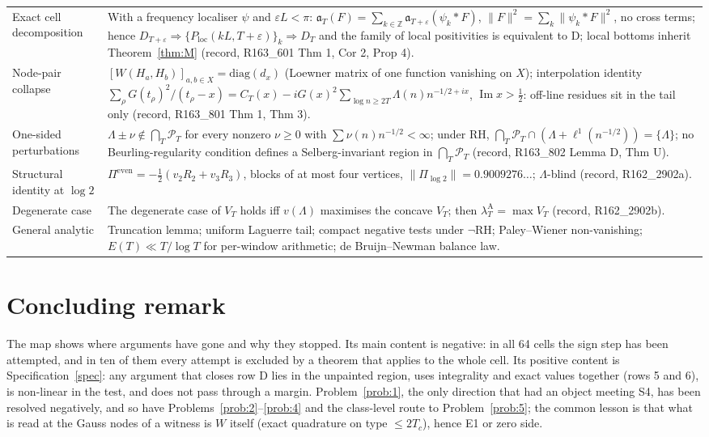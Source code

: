 \documentclass[11pt]{amsart}
\theoremstyle{definition}
\theoremstyle{remark}
\newcommand{\Z}{\mathbb Z}
\newcommand{\Iml}{\operatorname{Im}}
\newcommand{\PT}{\mathcal P_T}
\newcommand{\lamA}{\lambda^{\mathrm A}_T}
\begin{document}
\begin{longtable}{@{}p{4.2cm}p{10.3cm}@{}}
Exact cell decomposition & With a frequency localiser $\psi$ and $\varepsilon L<\pi$: $\mathfrak a_T(F)=\sum_{k\in\Z}\mathfrak a_{T+\varepsilon}(\psi_k*F)$, $\|F\|^2=\sum_k\|\psi_k*F\|^2$, no cross terms; hence $D_{T+\varepsilon}\Rightarrow\{P_{\mathrm{loc}}(kL,T+\varepsilon)\}_k\Rightarrow D_T$ and the family of local positivities is equivalent to D; local bottoms inherit Theorem~\ref{thm:M} (record, R163\_601 Thm 1, Cor 2, Prop 4). \\
Node-pair collapse & $[W(H_a,H_b)]_{a,b\in X}=\mathrm{diag}(d_x)$ (Loewner matrix of one function vanishing on $X$); interpolation identity $\sum_\rho G(t_\rho)^2/(t_\rho-x)=C_T(x)-iG(x)^2\sum_{\log n\ge2T}\Lambda(n)n^{-1/2+ix}$, $\Iml x>\frac12$: off-line residues sit in the tail only (record, R163\_801 Thm 1, Thm 3). \\
One-sided perturbations & $\Lambda\pm\nu\notin\bigcap_T\PT$ for every nonzero $\nu\ge0$ with $\sum\nu(n)n^{-1/2}<\infty$; under RH, $\bigcap_T\PT\cap(\Lambda+\ell^1(n^{-1/2}))=\{\Lambda\}$; no Beurling-regularity condition defines a Selberg-invariant region in $\bigcap_T\PT$ (record, R163\_802 Lemma D, Thm U). \\
Structural identity at $\log2$ & $\Pi^{\mathrm{even}}=-\frac12(v_2R_2+v_3R_3)$, blocks of at most four vertices, $\|\Pi_{\log2}\|=0.9009276\ldots$; $\Lambda$-blind (record, R162\_2902a). \\
Degenerate case & The degenerate case of $V_T$ holds iff $v(\Lambda)$ maximises the concave $V_T$; then $\lamA=\max V_T$ (record, R162\_2902b). \\
General analytic & Truncation lemma; uniform Laguerre tail; compact negative tests under $\neg$RH; Paley--Wiener non-vanishing; $E(T)\ll T/\log T$ for per-window arithmetic; de Bruijn--Newman balance law. \\
\end{longtable}

\section*{Concluding remark}
The map shows where arguments have gone and why they stopped. Its main content is negative: in all
64 cells the sign step has been attempted, and in ten of them every attempt is excluded by a theorem that
applies to the whole cell. Its positive content is Specification~\ref{spec}: any argument that closes row D
lies in the unpainted region, uses integrality and exact values together (rows 5 and 6), is non-linear in
the test, and does not pass through a margin. Problem~\ref{prob:1}, the only direction that had an object meeting S4, has been resolved
negatively, and so have Problems~\ref{prob:2}--\ref{prob:4} and the class-level route to Problem~\ref{prob:5}; the common lesson is that what is read at the Gauss
nodes of a witness is $W$ itself (exact quadrature on type $\le2T_c$), hence E1 or zero side.
\end{document}
